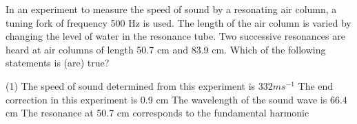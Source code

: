 
    \item In an experiment to measure the speed of sound by a resonating air column, a tuning fork of frequency 500 Hz is used. The length of the air column is varied by changing the level of water in the resonance tube. Two successive resonances are heard at air columns of length 50.7 cm and 83.9 cm. Which of the following statements is (are) true?
        \begin{tasks}(1)
            \task The speed of sound determined from this experiment is \(332 m s^{-1}\)
            \task The end correction in this experiment is 0.9 cm
            \task The wavelength of the sound wave is 66.4 cm
            \task The resonance at 50.7 cm corresponds to the fundamental harmonic
        \end{tasks}
